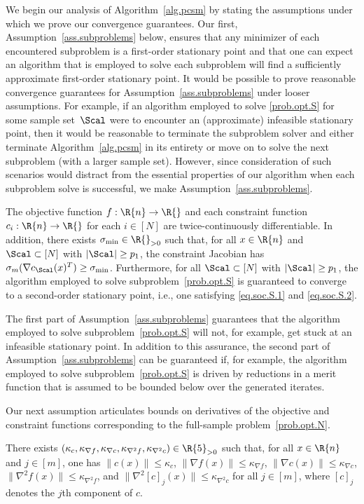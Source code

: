 We begin our analysis of Algorithm~\ref{alg.pcsm} by stating the assumptions under which we prove our convergence guarantees.  Our first, Assumption~\ref{ass.subproblems} below, ensures that any minimizer of each encountered subproblem is a first-order stationary point and that one can expect an algorithm that is employed to solve each subproblem will find a sufficiently approximate first-order stationary point.  It would be possible to prove reasonable convergence guarantees for Assumption~\ref{ass.subproblems} under looser assumptions.  For example, if an algorithm employed to solve \eqref{prob.opt.S} for some sample set~$\Scal$ were to encounter an (approximate) infeasible stationary point, then it would be reasonable to terminate the subproblem solver and either terminate Algorithm~\ref{alg.pcsm} in its entirety or move on to solve the next subproblem (with a larger sample set).  However, since consideration of such scenarios would distract from the essential properties of our algorithm when each subproblem solve is successful, we make Assumption~\ref{ass.subproblems}.

\bassumption\label{ass.subproblems}
  The objective function $f : \R{n} \to \R{}$ and each constraint function $c_i : \R{n} \to \R{}$ for each $i \in [N]$ are twice-continuously differentiable.  In addition, there exists $\sigma_{\min} \in \R{}_{>0}$ such that, for all $x \in \R{n}$ and $\Scal \subset [N]$ with $|\Scal| \geq p_1$, the constraint Jacobian has $\sigma_m(\nabla c_\Scal(x)^T) \geq \sigma_{\min}$.  Furthermore, for all $\Scal \subset [N]$ with $|\Scal| \geq p_1$, the algorithm employed to solve subproblem~\eqref{prob.opt.S} is guaranteed to converge to a second-order stationary point, i.e., one satisfying \eqref{eq.soc.S.1} and \eqref{eq.soc.S.2}.
\eassumption

The first part of Assumption~\ref{ass.subproblems} guarantees that the algorithm employed to solve subproblem~\eqref{prob.opt.S} will not, for example, get stuck at an infeasible stationary point.  In addition to this assurance, the second part of Assumption~\ref{ass.subproblems} can be guaranteed if, for example, the algorithm employed to solve subproblem~\eqref{prob.opt.S} is driven by reductions in a merit function that is assumed to be bounded below over the generated iterates.

Our next assumption articulates bounds on derivatives of the objective and constraint functions corresponding to the full-sample problem~\eqref{prob.opt.N}.

\bassumption\label{ass.boundness}
  There exists $(\kappa_c, \kappa_{\nabla f}, \kappa_{\nabla c}, \kappa_{\nabla^2 f}, \kappa_{\nabla^2 c}) \in \R{5}_{>0}$ such that, for all $x \in \R{n}$ and $j \in [m]$, one has $\|c(x)\|\le\kappa_c$, $\| \nabla f(x) \| \leq \kappa_{\nabla f}$, $\| \nabla c(x) \| \leq \kappa_{\nabla c}$, $\| \nabla^2 f(x) \| \leq \kappa_{\nabla^2 f}$, and $\| \nabla^2 [c]_j (x) \| \leq \kappa_{\nabla^2 c}$ for all $j \in [m]$, where $[c]_j$ denotes the $j$th component of $c$.
\eassumption

